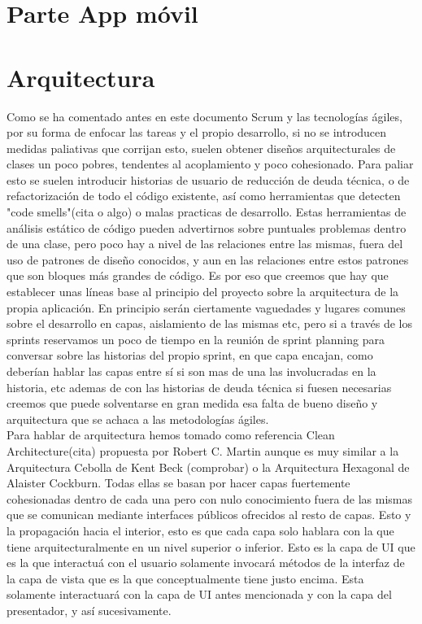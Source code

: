 \documentclass[../pfc.tex]{subfiles}
\begin{document}
	
	
	\section{Parte App móvil}
	
	\section{Arquitectura}
	
	Como se ha comentado antes en este documento Scrum y las tecnologías ágiles, por su forma de enfocar las tareas y el propio desarrollo, si no se introducen medidas paliativas que corrijan esto, suelen obtener diseños arquitecturales de clases un poco pobres, tendentes al acoplamiento y poco cohesionado. Para paliar esto se suelen introducir historias de usuario de reducción de deuda técnica, o de refactorización de todo el código existente, así como herramientas que detecten "code smells"(cita o algo) o malas practicas de desarrollo. Estas herramientas de análisis estático de código pueden advertirnos sobre puntuales problemas dentro de una clase, pero poco hay a nivel de las relaciones entre las mismas, fuera del uso de patrones de diseño conocidos, y aun en las relaciones entre estos patrones que son bloques más grandes de código. Es por eso que creemos que hay que establecer unas líneas base al principio del proyecto sobre la arquitectura de la propia aplicación. En principio serán ciertamente vaguedades y lugares comunes sobre el desarrollo en capas, aislamiento de las mismas etc, pero si a través de los sprints reservamos un poco de tiempo en la reunión de sprint planning para conversar sobre las historias del propio sprint, en que capa encajan, como deberían hablar las capas entre sí si son mas de una las involucradas en la historia, etc ademas de con las historias de deuda técnica si fuesen necesarias creemos que puede solventarse en gran medida esa falta de bueno diseño y arquitectura que se achaca a las metodologías ágiles.\\
	
	Para hablar de arquitectura hemos tomado como referencia Clean Architecture(cita) propuesta por Robert C. Martin aunque es muy similar a la Arquitectura Cebolla de Kent Beck (comprobar) o la Arquitectura Hexagonal de Alaister Cockburn. Todas ellas se basan por hacer capas fuertemente cohesionadas dentro de cada una pero con nulo conocimiento fuera de las mismas que se comunican mediante interfaces públicos ofrecidos al resto de capas. Esto y la propagación hacia el interior, esto es que cada capa solo hablara con la que tiene arquitecturalmente en un nivel superior o inferior. Esto es la capa de UI que es la que interactuá con el usuario solamente invocará métodos de la interfaz de la capa de vista que es la que conceptualmente tiene justo encima. Esta solamente interactuará con la capa de UI antes mencionada y con la capa del presentador, y así sucesivamente. 
	
\end{document}
